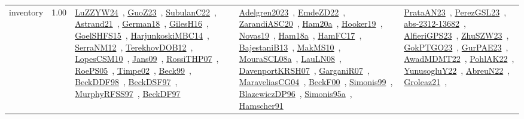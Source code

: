 {\begin{longtable}{p{3cm}r>{\raggedright\arraybackslash}p{6cm}>{\raggedright\arraybackslash}p{6cm}>{\raggedright\arraybackslash}p{8cm}}
\index{inventory}\index{Concepts!inventory}inventory &  1.00 & \href{../works/LuZZYW24.pdf}{LuZZYW24}~\cite{LuZZYW24}, \href{../works/GuoZ23.pdf}{GuoZ23}~\cite{GuoZ23}, \href{../works/SubulanC22.pdf}{SubulanC22}~\cite{SubulanC22}, \href{../works/Astrand21.pdf}{Astrand21}~\cite{Astrand21}, \href{../works/German18.pdf}{German18}~\cite{German18}, \href{../works/GilesH16.pdf}{GilesH16}~\cite{GilesH16}, \href{../works/GoelSHFS15.pdf}{GoelSHFS15}~\cite{GoelSHFS15}, \href{../works/HarjunkoskiMBC14.pdf}{HarjunkoskiMBC14}~\cite{HarjunkoskiMBC14}, \href{../works/SerraNM12.pdf}{SerraNM12}~\cite{SerraNM12}, \href{../works/TerekhovDOB12.pdf}{TerekhovDOB12}~\cite{TerekhovDOB12}, \href{../works/LopesCSM10.pdf}{LopesCSM10}~\cite{LopesCSM10}, \href{../works/Jans09.pdf}{Jans09}~\cite{Jans09}, \href{../works/RossiTHP07.pdf}{RossiTHP07}~\cite{RossiTHP07}, \href{../works/RoePS05.pdf}{RoePS05}~\cite{RoePS05}, \href{../works/Timpe02.pdf}{Timpe02}~\cite{Timpe02}, \href{../works/Beck99.pdf}{Beck99}~\cite{Beck99}, \href{../works/BeckDDF98.pdf}{BeckDDF98}~\cite{BeckDDF98}, \href{../works/BeckDSF97.pdf}{BeckDSF97}~\cite{BeckDSF97}, \href{../works/MurphyRFSS97.pdf}{MurphyRFSS97}~\cite{MurphyRFSS97}, \href{../works/BeckDF97.pdf}{BeckDF97}~\cite{BeckDF97} & \href{../works/Adelgren2023.pdf}{Adelgren2023}~\cite{Adelgren2023}, \href{../works/EmdeZD22.pdf}{EmdeZD22}~\cite{EmdeZD22}, \href{../works/ZarandiASC20.pdf}{ZarandiASC20}~\cite{ZarandiASC20}, \href{../works/Ham20a.pdf}{Ham20a}~\cite{Ham20a}, \href{../works/Hooker19.pdf}{Hooker19}~\cite{Hooker19}, \href{../works/Novas19.pdf}{Novas19}~\cite{Novas19}, \href{../works/Ham18a.pdf}{Ham18a}~\cite{Ham18a}, \href{../works/HamFC17.pdf}{HamFC17}~\cite{HamFC17}, \href{../works/BajestaniB13.pdf}{BajestaniB13}~\cite{BajestaniB13}, \href{../works/MakMS10.pdf}{MakMS10}~\cite{MakMS10}, \href{../works/MouraSCL08a.pdf}{MouraSCL08a}~\cite{MouraSCL08a}, \href{../works/LauLN08.pdf}{LauLN08}~\cite{LauLN08}, \href{../works/DavenportKRSH07.pdf}{DavenportKRSH07}~\cite{DavenportKRSH07}, \href{../works/GarganiR07.pdf}{GarganiR07}~\cite{GarganiR07}, \href{../works/MaraveliasCG04.pdf}{MaraveliasCG04}~\cite{MaraveliasCG04}, \href{../works/BeckF00.pdf}{BeckF00}~\cite{BeckF00}, \href{../works/Simonis99.pdf}{Simonis99}~\cite{Simonis99}, \href{../works/BlazewiczDP96.pdf}{BlazewiczDP96}~\cite{BlazewiczDP96}, \href{../works/Simonis95a.pdf}{Simonis95a}~\cite{Simonis95a}, \href{../works/Hamscher91.pdf}{Hamscher91}~\cite{Hamscher91} & \href{../works/PrataAN23.pdf}{PrataAN23}~\cite{PrataAN23}, \href{../works/PerezGSL23.pdf}{PerezGSL23}~\cite{PerezGSL23}, \href{../works/abs-2312-13682.pdf}{abs-2312-13682}~\cite{abs-2312-13682}, \href{../works/AlfieriGPS23.pdf}{AlfieriGPS23}~\cite{AlfieriGPS23}, \href{../works/ZhuSZW23.pdf}{ZhuSZW23}~\cite{ZhuSZW23}, \href{../works/GokPTGO23.pdf}{GokPTGO23}~\cite{GokPTGO23}, \href{../works/GurPAE23.pdf}{GurPAE23}~\cite{GurPAE23}, \href{../works/AwadMDMT22.pdf}{AwadMDMT22}~\cite{AwadMDMT22}, \href{../works/PohlAK22.pdf}{PohlAK22}~\cite{PohlAK22}, \href{../works/YunusogluY22.pdf}{YunusogluY22}~\cite{YunusogluY22}, \href{../works/AbreuN22.pdf}{AbreuN22}~\cite{AbreuN22}, \href{../works/Groleaz21.pdf}{Groleaz21}~\cite{Groleaz21}, 
\end{longtable}}
